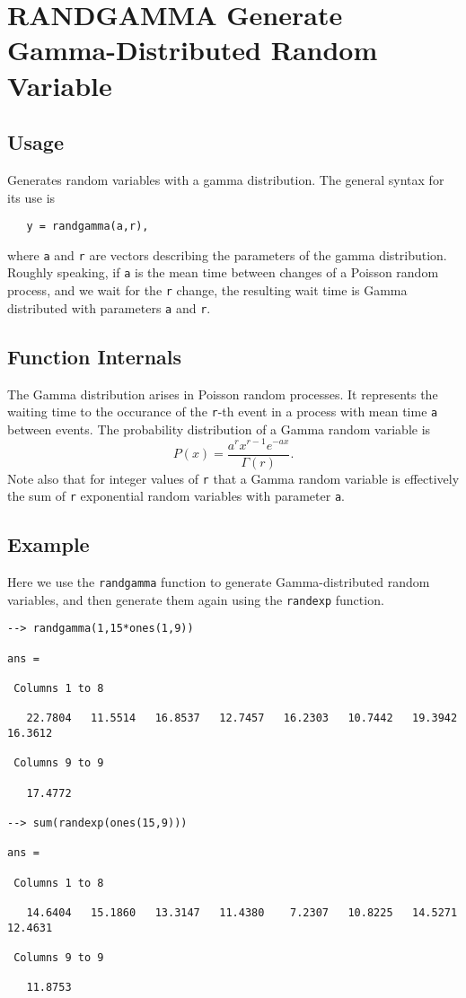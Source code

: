 \section{RANDGAMMA Generate Gamma-Distributed Random Variable}

\subsection{Usage}

Generates random variables with a gamma distribution.  The general
syntax for its use is
\begin{verbatim}
   y = randgamma(a,r),
\end{verbatim}
where \verb|a| and \verb|r| are vectors describing the parameters of the
gamma distribution.  Roughly speaking, if \verb|a| is the mean time between
changes of a Poisson random process, and we wait for the \verb|r| change,
the resulting wait time is Gamma distributed with parameters \verb|a| 
and \verb|r|.
\subsection{Function Internals}

The Gamma distribution arises in Poisson random processes.  It represents
the waiting time to the occurance of the \verb|r|-th event in a process with
mean time \verb|a| between events.  The probability distribution of a Gamma
random variable is
\[
   P(x) = \frac{a^r x^{r-1} e^{-ax}}{\Gamma(r)}.
\]
Note also that for integer values of \verb|r| that a Gamma random variable
is effectively the sum of \verb|r| exponential random variables with parameter
\verb|a|.
\subsection{Example}

Here we use the \verb|randgamma| function to generate Gamma-distributed
random variables, and then generate them again using the \verb|randexp|
function.
\begin{verbatim}
--> randgamma(1,15*ones(1,9))

ans = 

 Columns 1 to 8

   22.7804   11.5514   16.8537   12.7457   16.2303   10.7442   19.3942   16.3612 

 Columns 9 to 9

   17.4772 

--> sum(randexp(ones(15,9)))

ans = 

 Columns 1 to 8

   14.6404   15.1860   13.3147   11.4380    7.2307   10.8225   14.5271   12.4631 

 Columns 9 to 9

   11.8753 
\end{verbatim}
